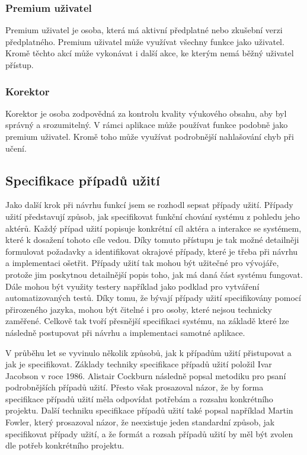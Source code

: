 \subsubsection{Premium uživatel}

Premium uživatel je osoba, která má aktivní předplatné nebo zkušební verzi předplatného. Premium uživatel může využívat všechny funkce jako uživatel. Kromě těchto akcí může vykonávat i další akce, ke kterým nemá běžný uživatel přístup.

\subsubsection{Korektor}

Korektor je osoba zodpovědná za kontrolu kvality výukového obsahu, aby byl správný a srozumitelný. V rámci aplikace může používat funkce podobně jako premium uživatel. Kromě toho může využívat podrobnější nahlašování chyb při učení.

\subsection{Specifikace případů užití}


Jako další krok při návrhu funkcí jsem se rozhodl sepsat případy užití. Případy užití představují způsob, jak specifikovat funkční chování systému z pohledu jeho aktérů. Každý případ užití popisuje konkrétní cíl aktéra a interakce se systémem, které k dosažení tohoto cíle vedou. Díky tomuto přístupu je tak možné detailněji formulovat požadavky a identifikovat okrajové případy, které je třeba při návrhu a implementaci ošetřit. Případy užití tak mohou být užitečné pro vývojáře, protože jim poskytnou detailnější popis toho, jak má daná část systému fungovat. Dále mohou být využity testery například jako podklad pro vytváření automatizovaných testů. Díky tomu, že bývají případy užití specifikovány pomocí přirozeného jazyka, mohou být čitelné i pro osoby, které nejsou technicky zaměřené. Celkově tak tvoří přesnější specifikaci systému, na základě které lze následně postupovat při návrhu a implementaci samotné aplikace. \cite{UseCases}

V průběhu let se vyvinulo několik způsobů, jak k případům užití přistupovat a jak je specifikovat. Základy techniky specifikace případů užití položil Ivar Jacobson v roce 1986. Alistair Cockburn \cite{Cockburn2001WritingEffectiveUseCases} následně popsal metodiku pro psaní podrobnějších případů užití. Přesto však prosazoval názor, že by forma specifikace případů užití měla odpovídat potřebám a rozsahu konkrétního projektu. Další techniku specifikace případů užití také popsal například Martin Fowler, který prosazoval názor, že neexistuje jeden standardní způsob, jak specifikovat případy užití, a že formát a rozsah případů užití by měl být zvolen dle potřeb konkrétního projektu. \cite[22-27]{NURUIDesignSteps}

